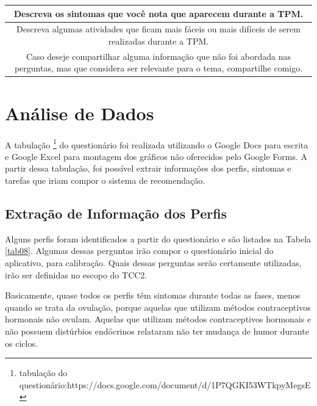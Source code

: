\begin{table}[h]
\begin{tabular}{c}
        \begin{minipage} [t] {1\textwidth} Descreva os sintomas que você nota que aparecem durante a TPM.\end{minipage}\\
        \midrule
        \begin{minipage} [t] {1\textwidth} Descreva algumas atividades que ficam mais fáceis ou mais difíceis de serem realizadas durante a TPM.\end{minipage}\\
        \midrule
        \begin{minipage} [t] {1\textwidth} Caso deseje compartilhar alguma informação que não foi abordada nas perguntas, mas que considera ser relevante para o tema, compartilhe comigo. \end{minipage}\\

		\bottomrule
	\end{tabular}
\end{table}


\section{Análise de Dados}

A tabulação \footnote{tabulação do questionário:https://docs.google.com/document/d/1P7QGKI53WTkpyMegsE} do questionário foi realizada utilizando o Google Docs para escrita e Google Excel para montagem dos gráficos não oferecidos 
pelo Google Forms. A partir dessa tabulação, foi possível extrair informações dos perfis, sintomas e tarefas que iriam compor o sistema de recomendação.

\subsection{Extração de Informação dos Perfis}

Alguns perfis foram identificados a partir do questionário e são listados na Tabela \ref{tab08}. Algumas dessas perguntas irão compor o questionário inicial do aplicativo, para calibração. Quais 
dessas perguntas serão certamente utilizadas, irão ser definidas no escopo do TCC2. 

Basicamente, quase todos os perfis têm sintomas durante todas as fases, menos quando se trata da ovulação, porque aquelas 
que utilizam métodos contraceptivos hormonais não ovulam. Aquelas que utilizam métodos contraceptivos hormonais e não possuem 
distúrbios endócrinos relataram não ter mudança de humor durante os ciclos.

